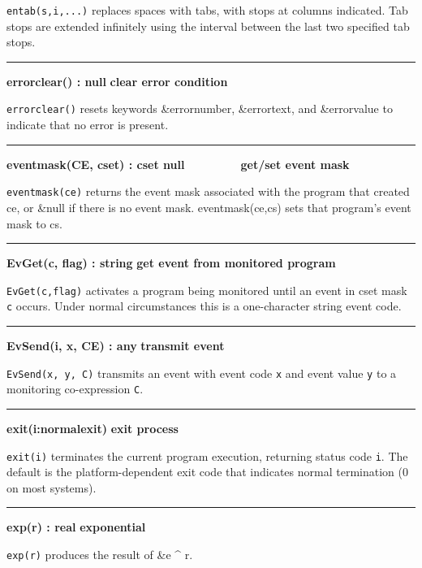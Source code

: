 \noindent
\texttt{entab(s,i,...)} replaces spaces with tabs, with stops at columns
indicated. Tab stops are extended infinitely using the interval between
the last two specified tab stops.

\bigskip\hrule\vspace{0.1cm}
\noindent
{\bf errorclear() : null } \hfill {\bf clear error condition}

\noindent
{}\texttt{errorclear()} resets keywords \&errornumber,
\&errortext, and \&errorvalue to indicate that no error is present.

\bigskip\hrule\vspace{0.1cm}
\noindent
{\bf eventmask(CE, cset) : cset {\textbar} null } \hfill {\bf \ \ \ \ \ \ \ \  get/set event mask}

\noindent
{}\texttt{eventmask(ce)} returns the event mask associated
with the program that created ce, or \&null if there is no event mask.
eventmask(ce,cs) sets that program's event mask to cs.

\bigskip\hrule\vspace{0.1cm}
\noindent
{\bf EvGet(c, flag) : string } \hfill {\bf get event from monitored program}

\noindent
\texttt{EvGet(c,flag)} activates a program being monitored until an event
in cset mask \texttt{c} occurs. Under normal circumstances this is a
one-character string event code.

\bigskip\hrule\vspace{0.1cm}
\noindent
{\bf EvSend(i, x, CE) : any } \hfill {\bf transmit event}

\noindent
{}\texttt{EvSend(x, y, C)} transmits an event with event
code \texttt{x} and event value \texttt{y} to a monitoring
co-expression \texttt{C}.

\bigskip\hrule\vspace{0.1cm}
\noindent
{\bf exit(i:normalexit) } \hfill {\bf exit process}

\noindent
{}\texttt{exit(i)} terminates the current program execution,
returning status code \texttt{i}. The default is the platform-dependent exit
code that indicates normal termination (0 on most systems).

\bigskip\hrule\vspace{0.1cm}
\noindent
{\bf exp(r) : real } \hfill {\bf exponential}

\noindent
{}\texttt{exp(r)} produces the result of \&e \^{} r.


